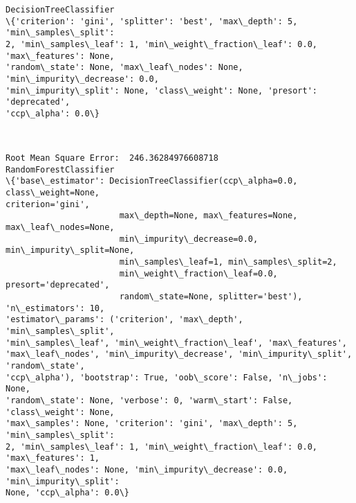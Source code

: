 \documentclass[11pt]{article}
\begin{document}
    \begin{Verbatim}[commandchars=\\\{\}]
DecisionTreeClassifier
\{'criterion': 'gini', 'splitter': 'best', 'max\_depth': 5, 'min\_samples\_split':
2, 'min\_samples\_leaf': 1, 'min\_weight\_fraction\_leaf': 0.0, 'max\_features': None,
'random\_state': None, 'max\_leaf\_nodes': None, 'min\_impurity\_decrease': 0.0,
'min\_impurity\_split': None, 'class\_weight': None, 'presort': 'deprecated',
'ccp\_alpha': 0.0\}
    \end{Verbatim}

    \begin{center}
    \end{center}
    { \hspace*{\fill} \\}
    
    \begin{Verbatim}[commandchars=\\\{\}]
Root Mean Square Error:  246.36284976608718
RandomForestClassifier
\{'base\_estimator': DecisionTreeClassifier(ccp\_alpha=0.0, class\_weight=None,
criterion='gini',
                       max\_depth=None, max\_features=None, max\_leaf\_nodes=None,
                       min\_impurity\_decrease=0.0, min\_impurity\_split=None,
                       min\_samples\_leaf=1, min\_samples\_split=2,
                       min\_weight\_fraction\_leaf=0.0, presort='deprecated',
                       random\_state=None, splitter='best'), 'n\_estimators': 10,
'estimator\_params': ('criterion', 'max\_depth', 'min\_samples\_split',
'min\_samples\_leaf', 'min\_weight\_fraction\_leaf', 'max\_features',
'max\_leaf\_nodes', 'min\_impurity\_decrease', 'min\_impurity\_split', 'random\_state',
'ccp\_alpha'), 'bootstrap': True, 'oob\_score': False, 'n\_jobs': None,
'random\_state': None, 'verbose': 0, 'warm\_start': False, 'class\_weight': None,
'max\_samples': None, 'criterion': 'gini', 'max\_depth': 5, 'min\_samples\_split':
2, 'min\_samples\_leaf': 1, 'min\_weight\_fraction\_leaf': 0.0, 'max\_features': 1,
'max\_leaf\_nodes': None, 'min\_impurity\_decrease': 0.0, 'min\_impurity\_split':
None, 'ccp\_alpha': 0.0\}
    \end{Verbatim}

    \begin{center}
    \end{center}
    { \hspace*{\fill} \\}
    
\end{document}
